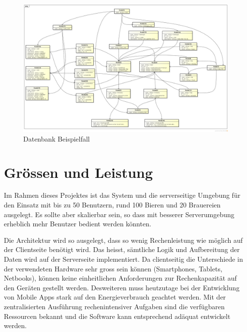 \documentclass[10pt,a4paper]{scrartcl}
\begin{document}
\begin{figure}[H]
	\includegraphics[height=\textwidth,angle=90]{Database_Example.png}
	\caption{Datenbank Beispielfall}
	\label{fig:database_design_example}
\end{figure}


\section{Grössen und Leistung}

Im Rahmen dieses Projektes ist das System und die serverseitige Umgebung für den
Einsatz mit bis zu 50 Benutzern, rund 100 Bieren und 20 Brauereien ausgelegt.
Es sollte aber skalierbar sein, so dass mit besserer Serverumgebung erheblich
mehr Benutzer bedient werden könnten.

Die Architektur wird so ausgelegt, dass so wenig Rechenleistung wie möglich auf der Clientseite
benötigt wird. Das heisst, sämtliche Logik und Aufbereitung der Daten wird auf der Serverseite
implementiert. Da clientseitig die Unterschiede in der verwendeten Hardware sehr gross sein
können (Smartphones, Tablets, Netbooks), können keine einheitlichen Anforderungen zur
Rechenkapazität auf den Geräten gestellt werden. Desweiteren muss heutzutage bei der Entwicklung
von Mobile Apps stark auf den Energieverbrauch geachtet werden. Mit der zentralisierten Ausführung
rechenintensiver Aufgaben sind die verfügbaren Ressourcen bekannt und die Software kann entsprechend
adäquat entwickelt werden.
\end{document}
